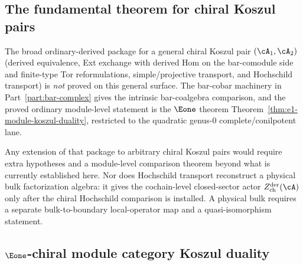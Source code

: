 \subsection{The fundamental theorem for chiral Koszul pairs}

\begin{remark}
\label{rem:module-category-frontier}
The broad ordinary-derived package for a general
chiral Koszul pair $(\cA_1,\cA_2)$
\textup{(}derived equivalence, Ext exchange with derived Hom on the
bar-comodule side and finite-type Tor reformulations, simple/projective
transport, and Hochschild transport\textup{)}
is \emph{not} proved on this general surface. The bar-cobar machinery
in Part~\ref{part:bar-complex} gives the intrinsic bar-coalgebra
comparison, and the proved ordinary module-level statement is the
$\Eone$ theorem
Theorem~\ref{thm:e1-module-koszul-duality}, restricted to the
quadratic genus-$0$ complete/conilpotent lane.

Any extension of that package to arbitrary chiral Koszul pairs would
require extra hypotheses and a module-level comparison theorem beyond
what is currently established here.
Nor does Hochschild transport reconstruct a physical bulk
factorization algebra: it gives the cochain-level closed-sector actor
$Z^{\mathrm{der}}_{\mathrm{ch}}(\cA)$ only after the chiral Hochschild
comparison is installed. A physical bulk requires a separate
bulk-to-boundary local-operator map and a quasi-isomorphism statement.
\end{remark}

\subsection{\texorpdfstring{$\Eone$-chiral module category Koszul duality}{E1-chiral module category Koszul duality}}

